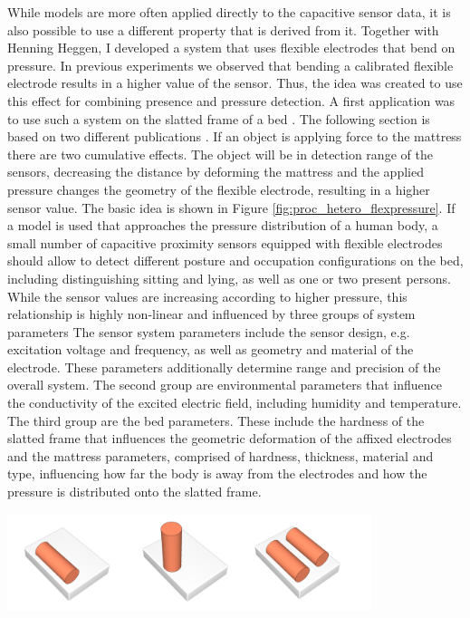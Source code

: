 While models are more often applied directly to the capacitive sensor data, it is also possible to use a different property that is derived from it. Together with Henning Heggen, I developed a system that uses flexible electrodes that bend on pressure. In previous experiments we observed that bending a calibrated flexible electrode results in a higher value of the sensor. Thus, the idea was created to use this effect for combining presence and pressure detection. A first application was to use such a system on the slatted frame of a bed \cite{braun2012context}. The following section is based on two different publications \cite{Hamisu2010,braun2012context}. If an object is applying force to the mattress there are two cumulative effects. The object will be in detection range of the sensors, decreasing the distance by deforming the mattress and the applied pressure changes the geometry of the flexible electrode, resulting in a higher sensor value. The basic idea is shown in Figure \ref{fig:proc_hetero_flexpressure}. If a model is used that approaches the pressure distribution of a human body, a small number of capacitive proximity sensors equipped with flexible electrodes should allow to detect different posture and occupation configurations on the bed, including distinguishing sitting and lying, as well as one or two present persons. While the sensor values are increasing according to higher pressure, this relationship is highly non-linear and influenced by three groups of system parameters The sensor system parameters include the sensor design, e.g. excitation voltage and frequency, as well as geometry and material of the electrode. These parameters additionally determine range and precision of the overall system. The second group are environmental parameters that influence the conductivity of the excited electric field, including humidity and temperature. The third group are the bed parameters. These include the hardness of the slatted frame that influences the geometric deformation of the affixed electrodes and the mattress parameters, comprised of hardness, thickness, material and type, influencing how far the body is away from the electrodes and how the pressure is distributed onto the slatted frame.

\begin{minipage}{\linewidth}
\centering
\includegraphics[width=0.8\textwidth]{images/prot_model_bed}
\label{fig:prot_model_bed}
\end{minipage}

